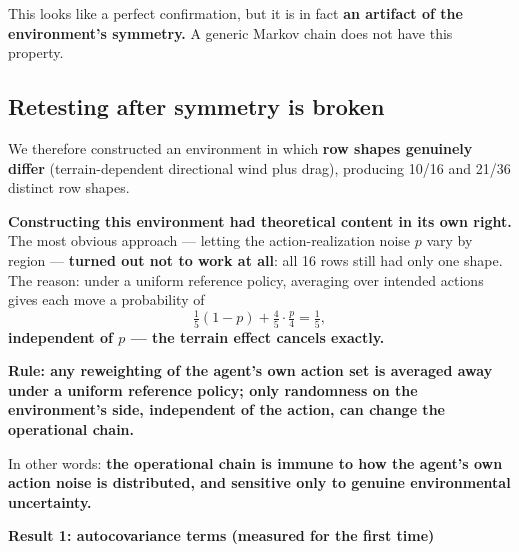 \documentclass[11pt]{article}
\renewenvironment{quote}
  {\def\FrameCommand{{\color{gray!60}\vrule width 2pt}\hspace{8pt}}%
   \MakeFramed{\advance\hsize-\width \FrameRestore}\begin{itshape}}
  {\end{itshape}\endMakeFramed}
\begin{document}
This looks like a perfect confirmation, but it is in fact \textbf{an artifact of the environment's symmetry.} A generic Markov chain does not have this property.

\hypertarget{retesting-after-symmetry-is-broken}{%
\subsection{Retesting after symmetry is broken}\label{retesting-after-symmetry-is-broken}}

We therefore constructed an environment in which \textbf{row shapes genuinely differ} (terrain-dependent directional wind plus drag), producing 10/16 and 21/36 distinct row shapes.

\textbf{Constructing this environment had theoretical content in its own right.} The most obvious approach --- letting the action-realization noise \(p\) vary by region --- \textbf{turned out not to work at all}: all 16 rows still had only one shape. The reason: under a uniform reference policy, averaging over intended actions gives each move a probability of
\[\tfrac15(1-p)+\tfrac45\cdot\tfrac{p}{4}=\tfrac15,\]
\textbf{independent of \(p\) --- the terrain effect cancels exactly.}

\begin{quote}
\textbf{Rule: any reweighting of the agent's own action set is averaged away under a uniform reference policy; only randomness on the environment's side, independent of the action, can change the operational chain.}

In other words: \textbf{the operational chain is immune to how the agent's own action noise is distributed, and sensitive only to genuine environmental uncertainty.}
\end{quote}

\textbf{Result 1: autocovariance terms (measured for the first time)}
\end{document}
